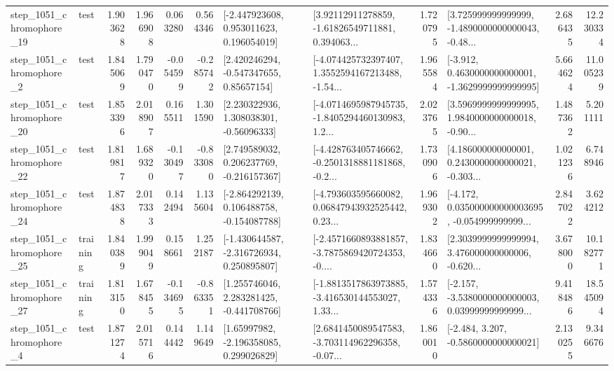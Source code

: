 \begin{tabular}{llrrrrllrlrr}
 step\_1051\_chromophore\_19 &      test &      1.903628 &    1.966908 &      0.063280 &  0.564346 &    [-2.447923608, 0.953011623, 0.196054019] &  [3.92112911278859, -1.61826549711881, 0.394063... &       1.720795 &  [3.725999999999999, -1.4890000000000043, -0.48... &            2.686435 &         12.230334 \\
  step\_1051\_chromophore\_2 &      test &      1.845069 &    1.790470 &     -0.054599 & -0.285742 &     [2.420246294, -0.547347655, 0.85657154] &  [-4.074425732397407, 1.3552594167213488, -1.54... &       1.965584 &  [-3.912, 0.4630000000000001, -1.3629999999999995] &            5.664624 &         11.005239 \\
 step\_1051\_chromophore\_20 &      test &      1.853396 &    2.018907 &      0.165511 &  1.301590 &     [2.230322936, 1.308038301, -0.56096333] &  [-4.0714695987945735, -1.8405294460130983, 1.2... &       2.023765 &  [3.5969999999999995, 1.9840000000000018, -0.90... &            1.487362 &          5.201111 \\
 step\_1051\_chromophore\_22 &      test &      1.819817 &    1.689320 &     -0.130497 & -0.833080 &    [2.749589032, 0.206237769, -0.216157367] &  [-4.428763405746662, -0.2501318881181868, -0.2... &       1.730906 &  [4.186000000000001, 0.2430000000000021, -0.303... &            1.021236 &          6.748946 \\
 step\_1051\_chromophore\_24 &      test &      1.874838 &    2.017333 &      0.142494 &  1.135604 &   [-2.864292139, 0.106488758, -0.154087788] &  [-4.793603595660082, 0.06847943932525442, 0.23... &       1.969302 &  [-4.172, 0.035000000000003695, -0.054999999999... &            2.847022 &          3.624212 \\
 step\_1051\_chromophore\_25 &  training &      1.840389 &    1.999049 &      0.158661 &  1.252187 &   [-1.430644587, -2.316726934, 0.250895807] &  [-2.4571660893881857, -3.7875869420724353, -0.... &       1.834660 &  [2.3039999999999994, 3.476000000000006, -0.620... &            3.678000 &         10.182771 \\
 step\_1051\_chromophore\_27 &  training &      1.813150 &    1.678455 &     -0.134695 & -0.863351 &    [1.255746046, 2.283281425, -0.441708766] &  [-1.8813517863973885, -3.416530144553027, 1.33... &       1.574336 &  [-2.157, -3.5380000000000003, 0.03999999999999... &            9.418486 &         18.545094 \\
  step\_1051\_chromophore\_4 &      test &      1.871274 &    2.015716 &      0.144442 &  1.149649 &     [1.65997982, -2.196358085, 0.299026829] &  [2.6841450089547583, -3.703114962296358, -0.07... &       1.860010 &               [-2.484, 3.207, -0.5860000000000021] &            2.130255 &          9.346676 \\

\end{tabular}
